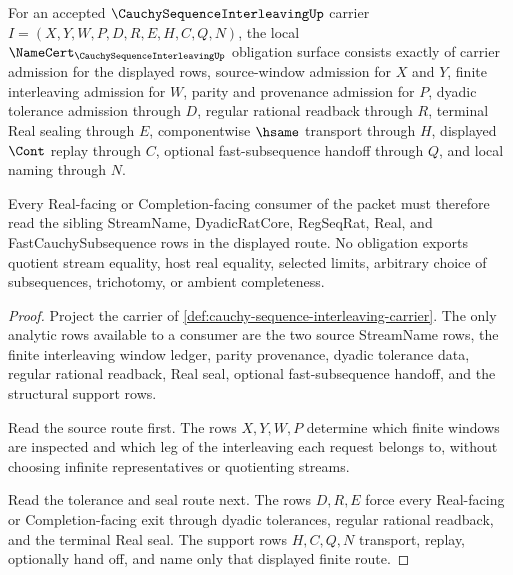 \begin{theorem}
\label{thm:cauchy-sequence-interleaving-namecert-obligations}
For an accepted $\CauchySequenceInterleavingUp$ carrier $I=(X,Y,W,P,D,R,E,H,C,Q,N)$, the local $\NameCert_{\CauchySequenceInterleavingUp}$ obligation surface consists exactly of carrier admission for the displayed rows, source-window admission for $X$ and $Y$, finite interleaving admission for $W$, parity and provenance admission for $P$, dyadic tolerance admission through $D$, regular rational readback through $R$, terminal Real sealing through $E$, componentwise $\hsame$ transport through $H$, displayed $\Cont$ replay through $C$, optional fast-subsequence handoff through $Q$, and local naming through $N$.

Every Real-facing or Completion-facing consumer of the packet must therefore read the sibling StreamName, DyadicRatCore, RegSeqRat, Real, and FastCauchySubsequence rows in the displayed route. No obligation exports quotient stream equality, host real equality, selected limits, arbitrary choice of subsequences, trichotomy, or ambient completeness.
\end{theorem}
\begin{proof}
Project the carrier of \autoref{def:cauchy-sequence-interleaving-carrier}. The only analytic rows available to a consumer are the two source StreamName rows, the finite interleaving window ledger, parity provenance, dyadic tolerance data, regular rational readback, Real seal, optional fast-subsequence handoff, and the structural support rows.

Read the source route first. The rows $X,Y,W,P$ determine which finite windows are inspected and which leg of the interleaving each request belongs to, without choosing infinite representatives or quotienting streams.

Read the tolerance and seal route next. The rows $D,R,E$ force every Real-facing or Completion-facing exit through dyadic tolerances, regular rational readback, and the terminal Real seal. The support rows $H,C,Q,N$ transport, replay, optionally hand off, and name only that displayed finite route.
\end{proof}

